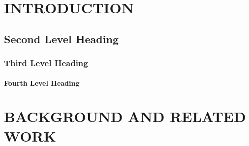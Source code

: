 \documentclass[twoside]{article}
\begin{document}
\section{INTRODUCTION}


\subsection{Second Level Heading}

\subsubsection{Third Level Heading}

\paragraph{Fourth Level Heading}

\section{BACKGROUND AND RELATED WORK}

\end{document}
